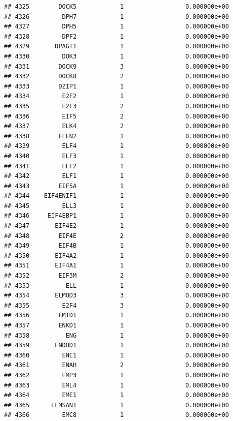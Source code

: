 \documentclass[
]{article}
\begin{document}
\begin{verbatim}
## 4325        DOCK5            1                 0.000000e+00
## 4326         DPH7            1                 0.000000e+00
## 4327         DPH5            1                 0.000000e+00
## 4328         DPF2            1                 0.000000e+00
## 4329       DPAGT1            1                 0.000000e+00
## 4330         DOK3            1                 0.000000e+00
## 4331        DOCK9            3                 0.000000e+00
## 4332        DOCK8            2                 0.000000e+00
## 4333        DZIP1            1                 0.000000e+00
## 4334         E2F2            1                 0.000000e+00
## 4335         E2F3            2                 0.000000e+00
## 4336         EIF5            2                 0.000000e+00
## 4337         ELK4            2                 0.000000e+00
## 4338        ELFN2            1                 0.000000e+00
## 4339         ELF4            1                 0.000000e+00
## 4340         ELF3            1                 0.000000e+00
## 4341         ELF2            1                 0.000000e+00
## 4342         ELF1            1                 0.000000e+00
## 4343        EIF5A            1                 0.000000e+00
## 4344    EIF4ENIF1            1                 0.000000e+00
## 4345         ELL3            1                 0.000000e+00
## 4346     EIF4EBP1            1                 0.000000e+00
## 4347       EIF4E2            1                 0.000000e+00
## 4348        EIF4E            2                 0.000000e+00
## 4349        EIF4B            1                 0.000000e+00
## 4350       EIF4A2            1                 0.000000e+00
## 4351       EIF4A1            1                 0.000000e+00
## 4352        EIF3M            2                 0.000000e+00
## 4353          ELL            1                 0.000000e+00
## 4354       ELMOD3            3                 0.000000e+00
## 4355         E2F4            3                 0.000000e+00
## 4356        EMID1            1                 0.000000e+00
## 4357        ENKD1            1                 0.000000e+00
## 4358          ENG            1                 0.000000e+00
## 4359       ENDOD1            1                 0.000000e+00
## 4360         ENC1            1                 0.000000e+00
## 4361         ENAH            2                 0.000000e+00
## 4362         EMP3            1                 0.000000e+00
## 4363         EML4            1                 0.000000e+00
## 4364         EME1            1                 0.000000e+00
## 4365      ELMSAN1            1                 0.000000e+00
## 4366         EMC8            1                 0.000000e+00

\end{verbatim}
\end{document}
